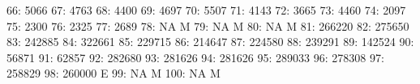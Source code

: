 \documentclass[nojss]{jss}
\begin{document}
\begin{Schunk}
\begin{Soutput}
 66:                       5066                                           
 67:                       4763                                           
 68:                       4400                                           
 69:                       4697                                           
 70:                       5507                                           
 71:                       4143                                           
 72:                       3665                                           
 73:                       4460                                           
 74:                       2097                                           
 75:                       2300                                           
 76:                       2325                                           
 77:                       2689                                           
 78:                         NA                                          M
 79:                         NA                                          M
 80:                         NA                                          M
 81:                     266220                                           
 82:                     275650                                           
 83:                     242885                                           
 84:                     322661                                           
 85:                     229715                                           
 86:                     214647                                           
 87:                     224580                                           
 88:                     239291                                           
 89:                     142524                                           
 90:                      56871                                           
 91:                      62857                                           
 92:                     282680                                           
 93:                     281626                                           
 94:                     281626                                           
 95:                     289033                                           
 96:                     278308                                           
 97:                     258829                                           
 98:                     260000                                          E
 99:                         NA                                          M
100:                         NA                                          M

\end{Soutput}
\end{Schunk}
\end{document}
